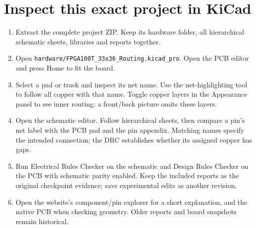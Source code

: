 \documentclass[10pt,a4paper]{article}
\begin{document}
\section{Inspect this exact project in KiCad}
\begin{enumerate}
\item Extract the complete project ZIP. Keep its hardware folder, all hierarchical schematic sheets, libraries and reports together.
\item Open \nolinkurl{hardware/FPGA100T_33x36_Routing.kicad_pro}. Open the PCB editor and press Home to fit the board.
\item Select a pad or track and inspect its net name. Use the net-highlighting tool to follow all copper with that name. Toggle copper layers in the Appearance panel to see inner routing; a front/back picture omits these layers.
\item Open the schematic editor. Follow hierarchical sheets, then compare a pin's net label with the PCB pad and the pin appendix. Matching names specify the intended connection; the DRC establishes whether its assigned copper has gaps.
\item Run Electrical Rules Checker on the schematic and Design Rules Checker on the PCB with schematic parity enabled. Keep the included reports as the original checkpoint evidence; save experimental edits as another revision.
\item Open the website's component/pin explorer for a short explanation, and the native PCB when checking geometry. Older reports and board snapshots remain historical.
\end{enumerate}
\end{document}
